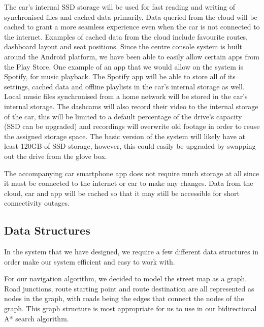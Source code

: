 \documentclass{article}
\begin{document}
The car's internal SSD storage will be used for fast reading and writing of synchronised files and cached data primarily. Data queried from the cloud will be cached to grant a more seamless experience even when the car is not connected to the internet. Examples of cached data from the cloud include favourite routes, dashboard layout and seat positions. Since the centre console system is built around the Android platform, we have been able to easily allow certain apps from the Play Store. One example of an app that we would allow on the system is Spotify, for music playback. The Spotify app will be able to store all of its settings, cached data and offline playlists in the car's internal storage as well. Local music files synchronised from a home network will be stored in the car's internal storage. The dashcams will also record their video to the internal storage of the car, this will be limited to a default percentage of the drive's capacity (SSD can be upgraded) and recordings will overwrite old footage in order to reuse the assigned storage space. The basic version of the system will likely have at least 120GB of SSD storage, however, this could easily be upgraded by swapping out the drive from the glove box.
% 
% 

The accompanying car smartphone app does not require much storage at all since it must be connected to the internet or car to make any changes. Data from the cloud, car and app will be cached so that it may still be accessible for short connectivity outages.

\subsection{Data Structures}\label{ssec:data-structures} %
In the system that we have designed, we require a few different data structures in order make our system efficient and easy to work with.

For our navigation algorithm, we decided to model the street map as a graph. Road junctions, route starting point and route destination are all represented as nodes in the graph, with roads being the edges that connect the nodes of the graph. This graph structure is most appropriate for us to use in our bidirectional A* search algorithm.
\end{document}
